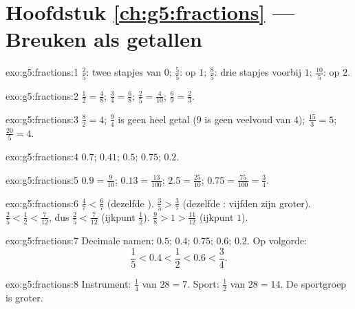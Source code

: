\section*{Hoofdstuk \ref{ch:g5:fractions} --- Breuken als getallen}

\begin{solution}{exo:g5:fractions:1}
$\frac25$: twee stapjes van $0$; $\frac55$: op $1$; $\frac85$: drie stapjes
voorbij $1$; $\frac{10}{5}$: op $2$.
\end{solution}

\begin{solution}{exo:g5:fractions:2}
$\frac12 = \frac48$; \quad $\frac34 = \frac68$; \quad
$\frac25 = \frac{4}{10}$; \quad $\frac69 = \frac23$.
\end{solution}

\begin{solution}{exo:g5:fractions:3}
$\frac82 = 4$; \quad $\frac94$ is geen heel getal ($9$ is geen veelvoud van
$4$); \quad $\frac{15}{3} = 5$; \quad $\frac{20}{5} = 4$.
\end{solution}

\begin{solution}{exo:g5:fractions:4}
$0.7$; \quad $0.41$; \quad $0.5$; \quad $0.75$; \quad $0.2$.
\end{solution}

\begin{solution}{exo:g5:fractions:5}
$0.9 = \frac{9}{10}$; \quad $0.13 = \frac{13}{100}$; \quad
$2.5 = \frac{25}{10}$; \quad $0.75 = \frac{75}{100} = \frac34$.
\end{solution}

\begin{solution}{exo:g5:fractions:6}
$\frac47 < \frac67$ (dezelfde ). \quad
$\frac35 > \frac37$ (dezelfde : vijfden zijn groter). \quad
$\frac25 < \frac12 < \frac{7}{12}$, dus $\frac25 < \frac{7}{12}$ (ijkpunt
$\frac12$). \quad
$\frac98 > 1 > \frac{11}{12}$ (ijkpunt $1$).
\end{solution}

\begin{solution}{exo:g5:fractions:7}
Decimale namen: $0.5$; $0.4$; $0.75$; $0.6$; $0.2$. Op volgorde:
\[
\frac15 < 0.4 < \frac12 < 0.6 < \frac34 .
\]
\end{solution}

\begin{solution}{exo:g5:fractions:8}
Instrument: $\frac14$ van $28 = 7$. Sport: $\frac12$ van $28 = 14$. De
sportgroep is groter.
\end{solution}

